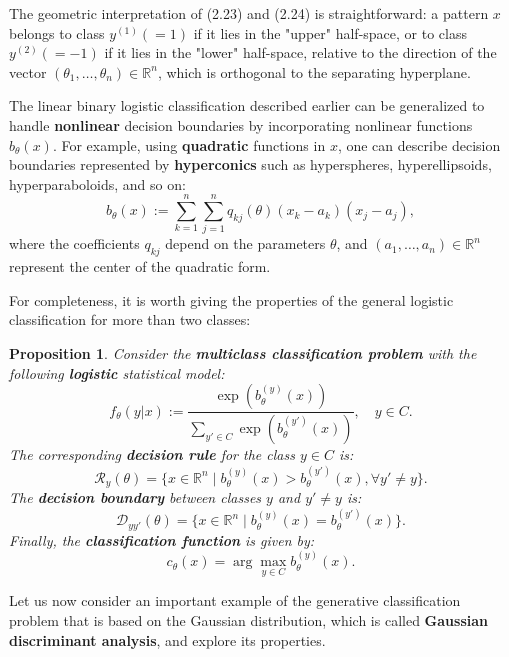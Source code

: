 \documentclass{report}
\newtheorem{proposition}{Proposition}[chapter]
\begin{document}
The geometric interpretation of (2.23) and (2.24) is straightforward: a pattern $x$ belongs to class $y^{(1)} (=1)$ if it lies in the "upper" half-space, or to class $y^{(2)}(=-1)$ if it lies in the "lower" half-space, relative to the direction of the vector $(\theta_1,\dots,\theta_n) \in \mathbb{R}^n$, which is orthogonal to the separating hyperplane.

The linear binary logistic classification described earlier can be generalized to handle \textbf{nonlinear} decision boundaries by incorporating nonlinear functions $b_\theta(x)$. For example, using \textbf{quadratic} functions in $x$, one can describe decision boundaries represented by \textbf{hyperconics} such as hyperspheres, hyperellipsoids, hyperparaboloids, and so on:
\begin{equation}
 b_\theta(x) := \sum_{k=1}^{n}\sum_{j=1}^{n}q_{kj}(\theta)(x_k-a_k)(x_j - a_j),
\end{equation}
where the coefficients $q_{kj}$ depend on the parameters $\theta$, and $(a_1,\dots,a_n) \in \mathbb{R}^n$ represent the center of the quadratic form.

For completeness, it is worth giving the properties of the general logistic classification for more than two classes:

\begin{proposition}
Consider the \textbf{multiclass classification problem} with the following \textbf{logistic} statistical model:
\begin{equation}
f_\theta(y|x) := \frac{\exp(b_\theta^{(y)}(x))}{\sum_{y' \in C}\exp(b_\theta^{(y')}(x))}, \quad y \in C.
\end{equation}
The corresponding \textbf{decision rule} for the class $y \in C$ is:
\begin{equation}
\mathcal{R}_y(\theta) = \{x \in \mathbb{R}^n \mid b_\theta^{(y)}(x) > b_\theta^{(y')}(x), \forall y' \neq y\}.
\end{equation}
The \textbf{decision boundary} between classes $y$ and $y' \neq y$ is:
\begin{equation}
\mathcal{D}_{yy'}(\theta) = \{x \in \mathbb{R}^n \mid b_\theta^{(y)}(x) = b_\theta^{(y')}(x)\}.
\end{equation}
Finally, the \textbf{classification function} is given by:
\begin{equation}
c_\theta(x) = \arg \max_{y \in C} b_\theta^{(y)}(x).
\end{equation}
\end{proposition}

Let us now consider an important example of the generative classification problem that is based on the Gaussian distribution, which is called \textbf{Gaussian discriminant analysis}, and explore its properties.
\end{document}
